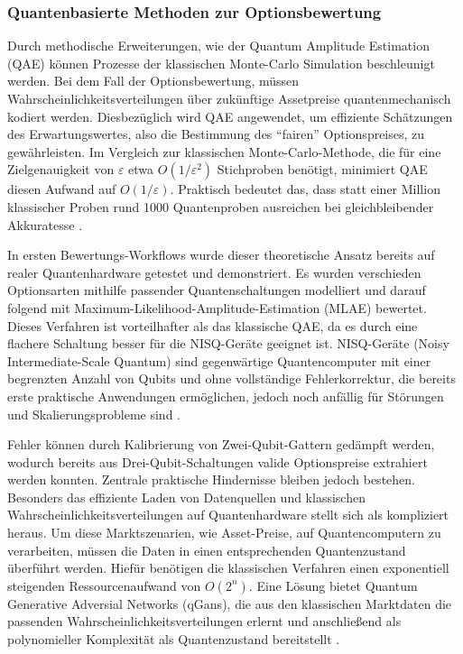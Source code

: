 \subsubsection*{Quantenbasierte Methoden zur Optionsbewertung}
Durch methodische Erweiterungen, wie der Quantum Amplitude Estimation (QAE) können Prozesse der klassischen Monte-Carlo Simulation beschleunigt werden. Bei dem Fall der Optionsbewertung, müssen Wahrscheinlichkeitsverteilungen über zukünftige Assetpreise quantenmechanisch kodiert werden. Diesbezüglich wird QAE angewendet, um effiziente Schätzungen des Erwartungswertes, also die Bestimmung des “fairen” Optionspreises, zu gewährleisten. Im Vergleich zur klassischen Monte-Carlo-Methode, die für eine Zielgenauigkeit von $\varepsilon$ etwa $O(1/\varepsilon^2)$ Stichproben benötigt, minimiert QAE diesen Aufwand auf $O(1/\varepsilon)$. Praktisch bedeutet das, dass statt einer Million klassischer Proben rund 1000 Quantenproben ausreichen bei gleichbleibender Akkuratesse \cite{Brassard/Lomonaco+Brandt; Montanaro, 2015}.

In ersten Bewertungs-Workflows wurde dieser theoretische Ansatz bereits auf realer Quantenhardware getestet und demonstriert. Es wurden verschieden Optionsarten mithilfe passender Quantenschaltungen modelliert und darauf folgend mit Maximum-Likelihood-Amplitude-Estimation (MLAE) bewertet. Dieses Verfahren ist vorteilhafter als das klassische QAE, da es durch eine flachere Schaltung besser für die NISQ-Geräte geeignet ist. NISQ-Geräte (Noisy Intermediate-Scale Quantum) sind gegenwärtige Quantencomputer mit einer begrenzten Anzahl von Qubits und ohne vollständige Fehlerkorrektur, die bereits erste praktische Anwendungen ermöglichen, jedoch noch anfällig für Störungen und Skalierungsprobleme sind \cite{stamatopoulos_option_2020}.

Fehler können durch Kalibrierung von Zwei-Qubit-Gattern gedämpft werden, wodurch bereits aus Drei-Qubit-Schaltungen valide Optionspreise extrahiert werden konnten. Zentrale praktische Hindernisse bleiben jedoch bestehen. Besonders das effiziente Laden von Datenquellen und klassischen Wahrscheinlichkeitsverteilungen auf Quantenhardware stellt sich als kompliziert heraus. Um diese Marktszenarien, wie Asset-Preise, auf Quantencomputern zu verarbeiten, müssen die Daten in einen entsprechenden Quantenzustand überführt werden. Hiefür benötigen die klassischen Verfahren einen exponentiell steigenden Ressourcenaufwand von $O(2^n)$. Eine Lösung bietet Quantum Generative Adversial Networks (qGans), die aus den klassischen Marktdaten die passenden Wahrscheinlichkeitsverteilungen erlernt und anschließend als polynomieller Komplexität als Quantenzustand bereitstellt \cite{zoufal_quantum_2019}.

